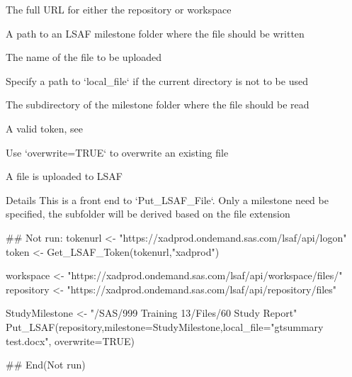 \documentclass[a4paper]{book}
\begin{document}
\begin{Arguments}
\begin{ldescription}
\item[\code{LSAF\_area}] The full URL for either the repository or workspace

\item[\code{milestone}] A path to an LSAF milestone folder where the file should be written

\item[\code{local\_file}] The name of the file to be uploaded

\item[\code{local\_path}] Specify a path to `local\_file` if the current directory
is not to be used

\item[\code{LSAF\_dir}] The subdirectory of the milestone folder where the file should
be read

\item[\code{token}] A valid token, see 

\item[\code{overwrite}] Use `overwrite=TRUE` to overwrite an existing file
\end{ldescription}
\end{Arguments}
%
\begin{Value}
A file is uploaded to LSAF
\end{Value}
%
\begin{Section}{Details}
This is a front end to `Put\_LSAF\_File`. Only a milestone
need be specified, the subfolder will be derived based on the file extension
\end{Section}
%
\begin{Examples}
\begin{ExampleCode}
## Not run: 
 tokenurl <- "https://xadprod.ondemand.sas.com/lsaf/api/logon"
 token <- Get_LSAF_Token(tokenurl,"xadprod")

 workspace <- "https://xadprod.ondemand.sas.com/lsaf/api/workspace/files/"
 repository <- "https://xadprod.ondemand.sas.com/lsaf/api/repository/files"

 StudyMilestone <- "/SAS/999 Training 13/Files/60 Study Report"
 Put_LSAF(repository,milestone=StudyMilestone,local_file="gtsummary test.docx", overwrite=TRUE)

## End(Not run)
\end{ExampleCode}
\end{Examples}
\end{document}
